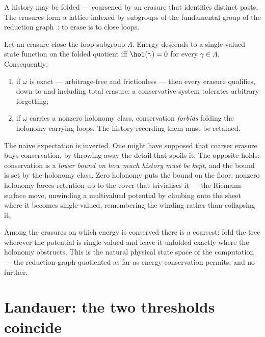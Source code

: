 A history may be folded --- coarsened by an erasure that identifies
distinct pasts.  The erasures form a lattice indexed by subgroups of the
fundamental group of the reduction graph~\cite{History}: to erase is to
close loops.

\begin{theorem}
\label{thm:price}
Let an erasure close the loop-subgroup $\Lambda$.  Energy descends to a
single-valued state function on the folded quotient iff
$\hol(\gamma) = 0$ for every $\gamma \in \Lambda$.  Consequently:
\begin{enumerate}[label=\textup{(\roman*)}]
  \item if $\omega$ is exact --- arbitrage-free and frictionless --- then
        every erasure qualifies, down to and including total erasure: a
        conservative system tolerates arbitrary forgetting;
  \item if $\omega$ carries a nonzero holonomy class, conservation
        \emph{forbids} folding the holonomy-carrying loops.  The history
        recording them must be retained.
\end{enumerate}
\end{theorem}

The naive expectation is inverted.  One might have supposed that coarser
erasure buys conservation, by throwing away the detail that spoils it.
The opposite holds: conservation is a \emph{lower bound on how much
history must be kept}, and the bound is set by the holonomy class.  Zero
holonomy puts the bound on the floor; nonzero holonomy forces retention up
to the cover that trivialises it --- the Riemann-surface move, unwinding a
multivalued potential by climbing onto the sheet where it becomes
single-valued, remembering the winding rather than collapsing it.

\begin{corollary}
\label{cor:maximal}
Among the erasures on which energy is conserved there is a coarsest: fold
the tree wherever the potential is single-valued and leave it unfolded
exactly where the holonomy obstructs.  This is the natural physical state
space of the computation --- the reduction graph quotiented as far as
energy conservation permits, and no further.
\end{corollary}

\section{Landauer: the two thresholds coincide}

